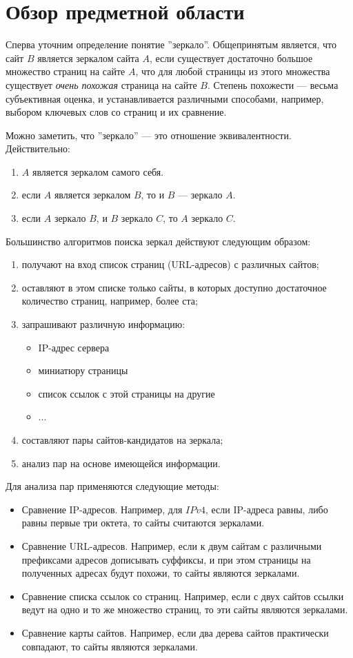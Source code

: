 \section{Обзор предметной области}
Сперва уточним определение понятие ''зеркало''. Общепринятым является, что сайт $B$ является зеркалом сайта $A$, если существует достаточно большое множество страниц на сайте $A$, что для любой страницы из этого множества существует \textit{очень похожая} страница на сайте $B$. Степень похожести — весьма субъективная оценка, и устанавливается различными способами, например, выбором ключевых слов со страниц и их сравнение.

Можно заметить, что ''зеркало'' — это отношение эквивалентности. Действительно:
\begin{enumerate}
\item $A$ является зеркалом самого себя.
\item если $A$ является зеркалом $B$, то и $B$ — зеркало $A$.
\item если $A$ зеркало $B$, и $B$ зеркало $C$, то $A$ зеркало $C$.
\end{enumerate}

Большинство алгоритмов поиска зеркал действуют следующим образом:
\begin{enumerate}
\item получают на вход список страниц (URL-адресов) с различных сайтов;
\item оставляют в этом списке только сайты, в которых доступно достаточное количество страниц, например, более ста;
\item запрашивают различную информацию:
\begin{itemize}
\item IP-адрес сервера
\item миниатюру страницы
\item список ссылок с этой страницы на другие
\item ...
\end{itemize}
\item составляют пары сайтов-кандидатов на зеркала;
\item анализ пар на основе имеющейся информации.
\end{enumerate}

Для анализа пар применяются следующие методы:
\begin{itemize}
\item Сравнение IP-адресов. Например, для $IPv4$, если IP-адреса равны, либо равны первые три октета, то сайты считаются зеркалами.
\item Сравнение URL-адресов. Например, если к двум сайтам с различными префиксами адресов дописывать суффиксы, и при этом страницы на полученных адресах будут похожи, то сайты являются зеркалами.
\item Сравнение списка ссылок со страниц. Например, если с двух сайтов ссылки ведут на одно и то же множество страниц, то эти сайты являются зеркалами.
\item Сравнение карты сайтов. Например, если два дерева сайтов практически совпадают, то сайты являются зеркалами.
\end{itemize}